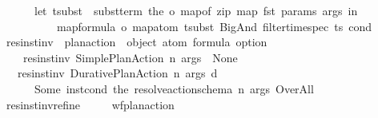 \begin{isabellebody}
\ \ \ \ \ \ {\isacharparenleft}{\kern0pt}let\ tsubst\ {\isacharequal}{\kern0pt}\ subst{\isacharunderscore}{\kern0pt}term\ {\isacharparenleft}{\kern0pt}the\ o\ {\isacharparenleft}{\kern0pt}map{\isacharunderscore}{\kern0pt}of\ {\isacharparenleft}{\kern0pt}zip\ {\isacharparenleft}{\kern0pt}map\ fst\ params{\isacharparenright}{\kern0pt}\ args{\isacharparenright}{\kern0pt}{\isacharparenright}{\kern0pt}{\isacharparenright}{\kern0pt}\ in\ \isanewline
\ \ \ \ \ \ \ \ \ \ {\isacharparenleft}{\kern0pt}map{\isacharunderscore}{\kern0pt}formula\ o\ map{\isacharunderscore}{\kern0pt}atom{\isacharparenright}{\kern0pt}\ tsubst\ {\isacharparenleft}{\kern0pt}BigAnd\ {\isacharparenleft}{\kern0pt}filter{\isacharunderscore}{\kern0pt}time{\isacharunderscore}{\kern0pt}spec\ ts\ cond{\isacharparenright}{\kern0pt}{\isacharparenright}{\kern0pt}{\isacharparenright}{\kern0pt}{\isachardoublequoteclose}\isanewline
\isanewline
\ \ \isamarkupfalse%
\ res{\isacharunderscore}{\kern0pt}inst{\isacharunderscore}{\kern0pt}inv\ {\isacharcolon}{\kern0pt}{\isacharcolon}{\kern0pt}\ {\isachardoublequoteopen}plan{\isacharunderscore}{\kern0pt}action\ {\isasymRightarrow}\ {\isacharparenleft}{\kern0pt}object\ atom{\isacharparenright}{\kern0pt}\ formula\ option{\isachardoublequoteclose}\ \ \isanewline
\ \ \ \ {\isachardoublequoteopen}res{\isacharunderscore}{\kern0pt}inst{\isacharunderscore}{\kern0pt}inv\ {\isacharparenleft}{\kern0pt}Simple{\isacharunderscore}{\kern0pt}Plan{\isacharunderscore}{\kern0pt}Action\ n\ args{\isacharparenright}{\kern0pt}\ {\isacharequal}{\kern0pt}\ None{\isachardoublequoteclose}\isanewline
\ \ {\isacharbar}{\kern0pt}\ {\isachardoublequoteopen}res{\isacharunderscore}{\kern0pt}inst{\isacharunderscore}{\kern0pt}inv\ {\isacharparenleft}{\kern0pt}Durative{\isacharunderscore}{\kern0pt}Plan{\isacharunderscore}{\kern0pt}Action\ n\ args\ d{\isacharparenright}{\kern0pt}\ {\isacharequal}{\kern0pt}\ \isanewline
\ \ \ \ \ \ Some\ {\isacharparenleft}{\kern0pt}inst{\isacharunderscore}{\kern0pt}cond\ {\isacharparenleft}{\kern0pt}the\ {\isacharparenleft}{\kern0pt}resolve{\isacharunderscore}{\kern0pt}action{\isacharunderscore}{\kern0pt}schema\ n{\isacharparenright}{\kern0pt}{\isacharparenright}{\kern0pt}\ args\ Over{\isacharunderscore}{\kern0pt}All{\isacharparenright}{\kern0pt}{\isachardoublequoteclose}\isanewline
\isanewline
\ \ \isamarkupfalse%
\ res{\isacharunderscore}{\kern0pt}inst{\isacharunderscore}{\kern0pt}inv{\isacharunderscore}{\kern0pt}refine{\isacharcolon}{\kern0pt}\isanewline
\ \ \ \ \ {\isachardoublequoteopen}wf{\isacharunderscore}{\kern0pt}plan{\isacharunderscore}{\kern0pt}action\ {\isasympi}{\isachardoublequoteclose}\isanewline

\end{isabellebody}

